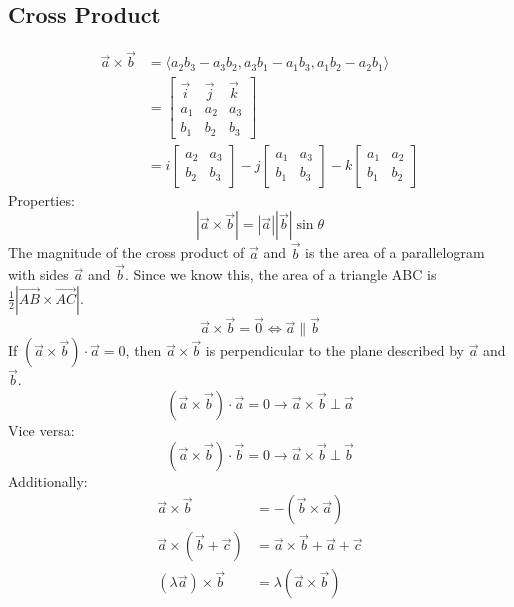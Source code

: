 \documentclass{math}
\begin{document}
\subsection*{Cross Product}
\begin{align*}
  \vec{a}\times\vec{b} &= \langle a_{2}b_{3}-a_{3}b_{2},a_{3}b_{1}-a_{1}b_{3},
  a_{1}b_{2}-a_{2}b_{1}\rangle \\
  &= \begin{bmatrix}
    \vec{i} & \vec{j} & \vec{k} \\
    a_{1} & a_{2} & a_{3} \\
    b_{1} & b_{2} & b_{3}
  \end{bmatrix} \\
  &= i\begin{bmatrix}
    a_{2} & a_{3} \\
    b_{2} & b_{3}
  \end{bmatrix}-j\begin{bmatrix}
    a_{1} & a_{3} \\
    b_{1} & b_{3}
  \end{bmatrix}-k\begin{bmatrix}
    a_{1} & a_{2} \\
    b_{1} & b_{2}
  \end{bmatrix}
\end{align*}
Properties:
\[ |\vec{a}\times\vec{b}| = |\vec{a}||\vec{b}|\sin\theta \]
The magnitude of the cross product of \( \vec{a} \) and \( \vec{b} \) is the
area of a parallelogram with sides \( \vec{a} \) and \( \vec{b} \). Since we
know this, the area of a triangle ABC is
\( \frac{1}{2}|\vec{AB}\times\vec{AC}| \).
\[ \vec{a}\times\vec{b} = \vec{0} \iff \vec{a}\parallel\vec{b} \]
If \( (\vec{a}\times\vec{b})\cdot\vec{a} = 0 \), then \( \vec{a}\times\vec{b} \)
is perpendicular to the plane described by \( \vec{a} \) and \( \vec{b} \).
\[ (\vec{a}\times\vec{b})\cdot\vec{a} =
  0 \to \vec{a}\times\vec{b}\ \bot\ \vec{a} \]
Vice versa:
\[ (\vec{a}\times\vec{b})\cdot\vec{b} =
  0 \to \vec{a}\times\vec{b}\ \bot\ \vec{b} \]
Additionally:
\begin{align*}
  \vec{a}\times\vec{b} &= -(\vec{b}\times\vec{a}) \\
  \vec{a}\times(\vec{b}+\vec{c}) &= \vec{a}\times\vec{b}+\vec{a}+\vec{c} \\
  (\lambda\vec{a})\times\vec{b} &= \lambda(\vec{a}\times\vec{b})
\end{align*}
\end{document}
